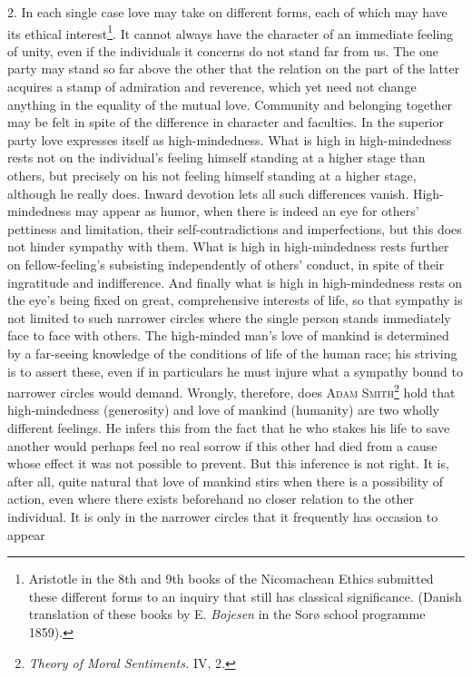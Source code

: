 \documentclass[12pt,a4paper,openany]{book}
\newcommand{\opage}[1]{\marginnote{\footnotesize\textit{[#1]}}}
\begin{document}
2. In each single case love may take on different forms, each of which may have its ethical
interest\footnote[2]{Aristotle in the 8th and 9th books of the Nicomachean Ethics submitted these different forms to
an inquiry that still has classical significance. (Danish translation of these books by E. \emph{Bojesen} in the Sorø
school programme 1859).}. It cannot always have the character of an immediate feeling of unity, even if the
individuals it concerns do not stand far from us. The one party may stand so far above the other that the relation
on the part of the latter acquires a stamp of admiration and reverence, which yet need not change anything in the
equality of the mutual love. Community and belonging together may be felt in spite of the difference in character and
faculties. In the superior party love expresses itself as high-mindedness. What is high in high-mindedness rests not
on the individual's feeling himself standing at a higher stage than others, but precisely on his not feeling himself
standing at a higher stage, although he really does. Inward devotion lets all such differences vanish.
High-mindedness may appear as humor, when there is indeed an eye for others' pettiness and limitation, their
self-contradictions and imperfections, but this does not hinder sympathy with them. What is high in high-mindedness
rests further on fellow-feeling's
\opage{243}subsisting independently of others' conduct, in spite of their ingratitude and indifference. And finally
what is high in high-mindedness rests on the eye's being fixed on great, comprehensive interests of life, so that
sympathy is not limited to such narrower circles where the single person stands immediately face to face with others.
The high-minded man's love of mankind is determined by a far-seeing knowledge of the conditions of life of the human
race; his striving is to assert these, even if in particulars he must injure what a sympathy bound to narrower circles
would demand. Wrongly, therefore, does \textsc{Adam Smith}\footnote[1]{\textit{Theory of Moral Sentiments.} IV, 2.}
hold that high-mindedness (generosity) and love of mankind (humanity) are two wholly different feelings. He infers
this from the fact that he who stakes his life to save another would perhaps feel no real sorrow if this other had
died from a cause whose effect it was not possible to prevent. But this inference is not right. It is, after all,
quite natural that love of mankind stirs when there is a possibility of action, even where there exists beforehand no
closer relation to the other individual. It is only in the narrower circles that it frequently has occasion to appear
\end{document}
